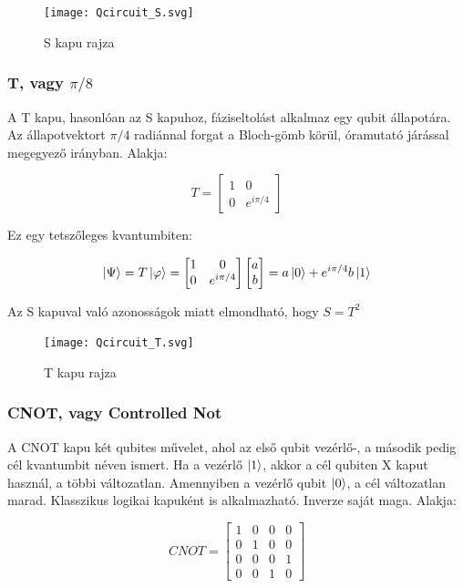 \documentclass[
]{thesis-ekf}
\theoremstyle{definition}
\theoremstyle{remark}
\begin{document}
\begin{figure}[H]
	\centering
	\texttt{[image: Qcircuit\_S.svg]}
	\caption{S kapu rajza}
	\label{fig:qcircuits}
\end{figure}


\subsubsection{T, vagy $\pi/8$}
A T kapu, hasonlóan az S kapuhoz, fáziseltolást alkalmaz egy qubit állapotára. Az állapotvektort $\pi/4$ radiánnal forgat a Bloch-gömb körül, óramutató járással megegyező irányban. Alakja:

\begin{equation}
	T= 
	\begin{bmatrix}
		1 & 0\\
		0 & e^{i\pi/4}
	\end{bmatrix}
\end{equation}

Ez egy tetszőleges kvantumbiten:

\begin{equation}
	\ket{\Psi}=T\ket{\varphi}=
	\begin{bmatrix}
		1 & 0\\
		0 & e^{i\pi/4}
	\end{bmatrix}
	\begin{bmatrix}
		a\\
		b
	\end{bmatrix}=a\ket{0}+e^{i\pi/4}b\ket{1}
\end{equation}

Az S kapuval való azonosságok miatt elmondható, hogy $S=T^{2}$

\begin{figure}[H]
	\centering
	\texttt{[image: Qcircuit\_T.svg]}
	\caption{T kapu rajza}
	\label{fig:qcircuitt}
\end{figure}


\subsubsection{CNOT, vagy Controlled Not}
A CNOT kapu két qubites művelet, ahol az első qubit vezérlő-, a második pedig cél kvantumbit néven ismert. Ha a vezérlő $\ket{1}$, akkor a cél qubiten X kaput használ, a többi változatlan. Amennyiben a vezérlő qubit $\ket{0}$, a cél változatlan marad. Klasszikus logikai kapuként is alkalmazható. Inverze saját maga. Alakja:

\begin{equation}
	CNOT= 
	\begin{bmatrix}
		1 & 0 & 0 & 0\\
		0 & 1 & 0 & 0\\
		0 & 0 & 0 & 1\\
		0 & 0 & 1 & 0
	\end{bmatrix}
\end{equation}
\end{document}
